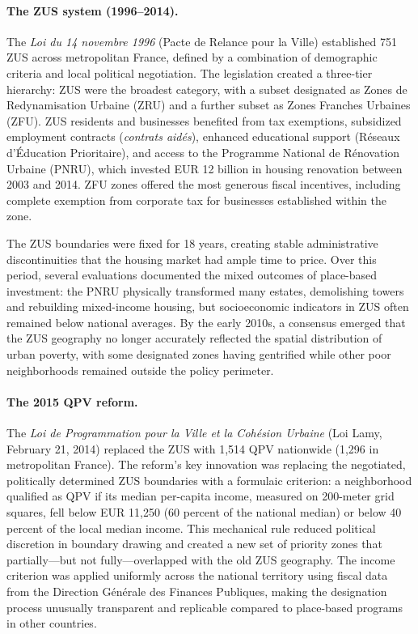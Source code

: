 \documentclass[12pt]{article}
\begin{document}
\paragraph{The ZUS system (1996--2014).} The \textit{Loi du 14 novembre 1996} (Pacte de Relance pour la Ville) established 751 ZUS across metropolitan France, defined by a combination of demographic criteria and local political negotiation. The legislation created a three-tier hierarchy: ZUS were the broadest category, with a subset designated as Zones de Redynamisation Urbaine (ZRU) and a further subset as Zones Franches Urbaines (ZFU). ZUS residents and businesses benefited from tax exemptions, subsidized employment contracts (\textit{contrats aid\'{e}s}), enhanced educational support (R\'{e}seaux d'\'{E}ducation Prioritaire), and access to the Programme National de R\'{e}novation Urbaine (PNRU), which invested EUR 12 billion in housing renovation between 2003 and 2014. ZFU zones offered the most generous fiscal incentives, including complete exemption from corporate tax for businesses established within the zone.

The ZUS boundaries were fixed for 18 years, creating stable administrative discontinuities that the housing market had ample time to price. Over this period, several evaluations documented the mixed outcomes of place-based investment: the PNRU physically transformed many estates, demolishing towers and rebuilding mixed-income housing, but socioeconomic indicators in ZUS often remained below national averages. By the early 2010s, a consensus emerged that the ZUS geography no longer accurately reflected the spatial distribution of urban poverty, with some designated zones having gentrified while other poor neighborhoods remained outside the policy perimeter.

\paragraph{The 2015 QPV reform.} The \textit{Loi de Programmation pour la Ville et la Coh\'{e}sion Urbaine} (Loi Lamy, February 21, 2014) replaced the ZUS with 1,514 QPV nationwide (1,296 in metropolitan France). The reform's key innovation was replacing the negotiated, politically determined ZUS boundaries with a formulaic criterion: a neighborhood qualified as QPV if its median per-capita income, measured on 200-meter grid squares, fell below EUR 11,250 (60 percent of the national median) or below 40 percent of the local median income. This mechanical rule reduced political discretion in boundary drawing and created a new set of priority zones that partially---but not fully---overlapped with the old ZUS geography. The income criterion was applied uniformly across the national territory using fiscal data from the Direction G\'{e}n\'{e}rale des Finances Publiques, making the designation process unusually transparent and replicable compared to place-based programs in other countries.
\end{document}
